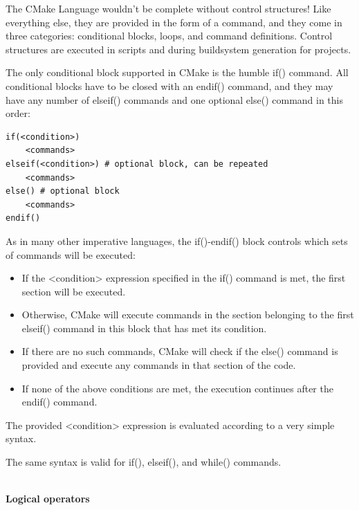 
The CMake Language wouldn't be complete without control structures! Like everything else, they are provided in the form of a command, and they come in three categories: conditional blocks, loops, and command definitions. Control structures are executed in scripts and during buildsystem generation for projects.


The only conditional block supported in CMake is the humble if() command. All conditional blocks have to be closed with an endif() command, and they may have any number of elseif() commands and one optional else() command in this order:

\begin{lstlisting}[style=styleCMake]
if(<condition>)
	<commands>
elseif(<condition>) # optional block, can be repeated
	<commands>
else() # optional block
	<commands>
endif()
\end{lstlisting}

As in many other imperative languages, the if()-endif() block controls which sets of commands will be executed:

\begin{itemize}
\item 
If the <condition> expression specified in the if() command is met, the first section will be executed.

\item 
Otherwise, CMake will execute commands in the section belonging to the first elseif() command in this block that has met its condition.

\item 
If there are no such commands, CMake will check if the else() command is provided and execute any commands in that section of the code.

\item 
If none of the above conditions are met, the execution continues after the endif() command.
\end{itemize}

The provided <condition> expression is evaluated according to a very simple syntax.


The same syntax is valid for if(), elseif(), and while() commands.

\hspace*{\fill} \\ %
\noindent
\textbf{Logical operators}

